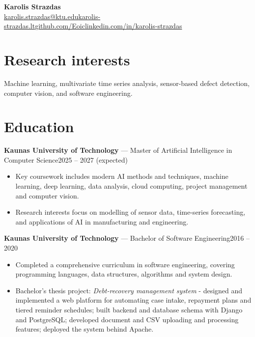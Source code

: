 \documentclass[10pt,a4paper]{article}
\makeatletter
\newcommand{\entry}[3]{\noindent\textbf{#1} — #2\hfill #3\\}
\newcommand{\Name}{Karolis Strazdas}
\newcommand{\Email}{karolis.strazdas@ktu.edu}
\newcommand{\Website}{https://karolis-strazdas.lt}
\newcommand{\GitHub}{https://github.com/Eoic}
\newcommand{\LinkedIn}{https://www.linkedin.com/in/karolis-strazdas/}
\makeatother
\begin{document}
\pagestyle{empty}

\begin{center}
{\Huge\bfseries \Name}\\[0.8em]
{\small \href{mailto:\Email}{\Email}\quad\textbullet\quad \href{\Website}{karolis-strazdas.lt}\quad\textbullet\quad \href{\GitHub}{github.com/Eoic}\quad\textbullet\quad \href{\LinkedIn}{linkedin.com/in/karolis-strazdas}}
\end{center}

\vspace{-0.7em}

\begingroup\small

\section*{Research interests}
Machine learning, multivariate time series analysis, sensor-based defect detection, computer vision, and software engineering.

\section*{Education}
\entry{Kaunas University of Technology}{Master of Artificial Intelligence in Computer Science}{2025 -- 2027 (expected)}
\vspace{-0.8em}
\begin{itemize}[leftmargin=*, topsep=0em]
  \item Key coursework includes modern AI methods and techniques, machine learning, deep learning, data analysis, cloud computing, project management and computer vision.
  \item Research interests focus on modelling of sensor data, time-series forecasting, and applications of AI in manufacturing and engineering.
\end{itemize}

\entry{Kaunas University of Technology}{Bachelor of Software Engineering}{2016 -- 2020}
\vspace{-0.8em}
\begin{itemize}[leftmargin=*, topsep=0em]
  \item Completed a comprehensive curriculum in software engineering, covering programming languages, data structures, algorithms and system design.
  \item Bachelor's thesis project: \emph{Debt-recovery management system} - designed and implemented a web platform for automating case intake, repayment plans and tiered reminder schedules; built backend and database schema with Django and PostgreSQL; developed document and CSV uploading and processing features; deployed the system behind Apache.
\end{itemize}
\end{document}
